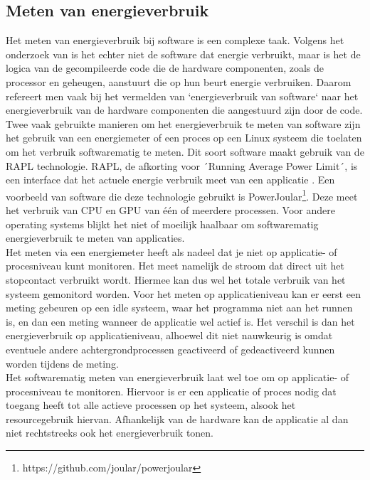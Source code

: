 \subsection{Meten van energieverbruik}
Het meten van energieverbruik bij software is een complexe taak. Volgens het onderzoek van \autocite{Dutta2023} is het echter niet de software dat energie verbruikt, maar is het de logica van de gecompileerde code die de hardware componenten, zoals de processor en geheugen, aanstuurt die op hun beurt energie verbruiken. Daarom refereert men vaak bij het vermelden van `energieverbruik van software` naar het energieverbruik van de hardware componenten die aangestuurd zijn door de code.\\

Twee vaak gebruikte manieren om het energieverbruik te meten van software zijn het gebruik van een energiemeter of een  proces op een Linux systeem die toelaten om het verbruik softwarematig te meten. Dit soort software maakt gebruik van  de RAPL technologie. RAPL, de afkorting voor ´Running Average Power Limit´, is een interface dat het actuele energie verbruik meet van een applicatie \autocite{Agarwal2023}. Een voorbeeld van software die deze technologie gebruikt is PowerJoular\footnote{https://github.com/joular/powerjoular}. Deze meet het verbruik van CPU en GPU van één of meerdere processen\autocite{Noureddine2022}. Voor andere operating systems blijkt het niet of moeilijk haalbaar om softwarematig energieverbruik te meten van applicaties. \\

Het meten via een energiemeter heeft als nadeel dat je niet op applicatie- of procesniveau kunt monitoren. Het meet namelijk de stroom dat direct uit het stopcontact verbruikt wordt. Hiermee kan dus wel het totale verbruik van het systeem gemonitord worden. Voor het meten op applicatieniveau kan er eerst een meting gebeuren op een idle systeem, waar het programma niet aan het runnen is, en dan een meting wanneer de applicatie wel actief is. Het verschil is dan het energieverbruik op applicatieniveau, alhoewel dit niet nauwkeurig is omdat eventuele andere achtergrondprocessen geactiveerd of gedeactiveerd kunnen worden tijdens de meting. \\

Het softwarematig meten van energieverbruik laat wel toe om op applicatie- of procesniveau te monitoren. Hiervoor is er een applicatie of proces nodig dat toegang heeft tot alle actieve processen op het systeem, alsook het resourcegebruik hiervan. Afhankelijk van de hardware kan de applicatie al dan niet rechtstreeks ook het energieverbruik tonen. \\



